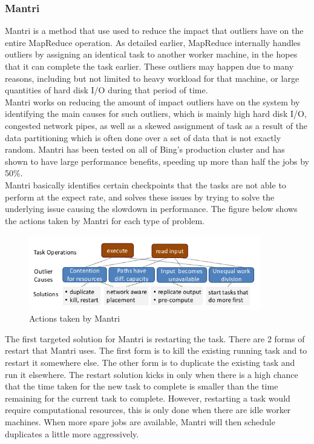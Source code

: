 \documentclass[]{article}
\begin{document}
\subsubsection{Mantri}
Mantri is a method that use used to reduce the impact that outliers have on the entire MapReduce operation. As detailed earlier, MapReduce internally handles outliers by assigning an identical task to another worker machine, in the hopes that it can complete the task earlier. These outliers may happen due to many reasons, including but not limited to heavy workload for that machine, or large quantities of hard disk I/O during that period of time. \\

Mantri works on reducing the amount of impact outliers have on the system by identifying the main causes for such outliers, which is mainly high hard disk I/O, congested network pipes, as well as a skewed assignment of task as a result of the data partitioning which is often done over a set of data that is not exactly random. Mantri has been tested on all of Bing's production cluster and has shown to have large performance benefits, speeding up more than half the jobs by 50\%. \\

Mantri basically identifies certain checkpoints that the tasks are not able to perform at the expect rate, and solves these issues by trying to solve the underlying issue causing the slowdown in performance. The figure below shows the actions taken by Mantri for each type of problem. \\
\begin{figure}[here]
	\begin{center}
		\includegraphics[width=0.9\textwidth]{mantri11.png}
		\caption{Actions taken by Mantri}
	\end{center}
\end{figure}

The first targeted solution for Mantri is restarting the task. There are 2 forms of restart that Mantri uses. The first form is to kill the existing running task and to restart it somewhere else. The other form is to duplicate the existing task and run it elsewhere. The restart solution kicks in only when there is a high chance that the time taken for the new task to complete is smaller than the time remaining for the current task to complete. However, restarting a task would require computational resources, this is only done when there are idle worker machines. When more spare jobs are available, Mantri will then schedule duplicates a little more aggressively.\\
\end{document}
